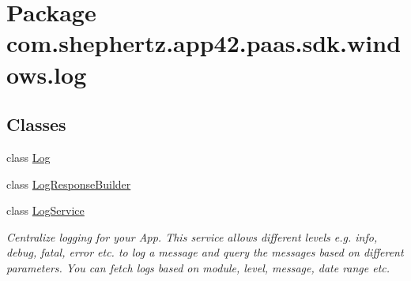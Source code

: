 \hypertarget{namespacecom_1_1shephertz_1_1app42_1_1paas_1_1sdk_1_1windows_1_1log}{\section{Package com.\+shephertz.\+app42.\+paas.\+sdk.\+windows.\+log}
\label{namespacecom_1_1shephertz_1_1app42_1_1paas_1_1sdk_1_1windows_1_1log}
}
\subsection*{Classes}
\begin{DoxyCompactItemize}
\item 
class \hyperlink{classcom_1_1shephertz_1_1app42_1_1paas_1_1sdk_1_1windows_1_1log_1_1_log}{Log}
\item 
class \hyperlink{classcom_1_1shephertz_1_1app42_1_1paas_1_1sdk_1_1windows_1_1log_1_1_log_response_builder}{Log\+Response\+Builder}
\item 
class \hyperlink{classcom_1_1shephertz_1_1app42_1_1paas_1_1sdk_1_1windows_1_1log_1_1_log_service}{Log\+Service}
\begin{DoxyCompactList}\small\item\em Centralize logging for your App. This service allows different levels e.\+g. info, debug, fatal, error etc. to log a message and query the messages based on different parameters. You can fetch logs based on module, level, message, date range etc. \end{DoxyCompactList}\end{DoxyCompactItemize}
